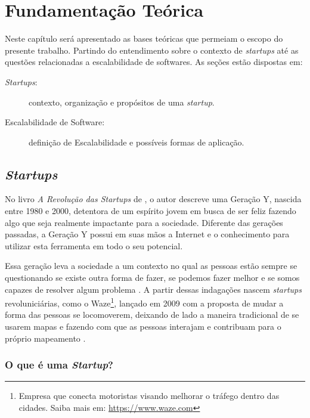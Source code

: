 \chapter[Fundamentação Teórica]{Fundamentação Teórica}

Neste capítulo será apresentado as bases teóricas que permeiam o escopo
do presente trabalho. Partindo do entendimento sobre o contexto de
\textit{startups} até as questões relacionadas a escalabilidade de softwares.
As seções estão dispostas em:

  \begin{description}
    \item[\textit{Startups}:] contexto, organização e propósitos de uma 
      \textit{startup}.
    \item[Escalabilidade de Software:] definição de Escalabilidade e 
      possíveis formas de aplicação.
  \end{description}

\section{\textit{Startups}}

No livro \textit{A Revolução das Startups} de ,
o autor descreve uma Geração Y, nascida entre 1980 e 2000, detentora de um
espírito jovem em busca de ser feliz fazendo algo que seja realmente
impactante para a sociedade. Diferente das gerações passadas, a Geração Y
possui em suas mãos a Internet e o conhecimento para utilizar esta
ferramenta em todo o seu potencial.

Essa geração leva a sociedade a um contexto no qual as pessoas estão sempre
se questionando se existe outra forma de fazer, se podemos fazer melhor e
se somos capazes de resolver algum problema \cite{ARevolucaoDasStartups}.
A partir dessas indagações nascem \textit{startups} revoluniciárias, como
o Waze\footnote{Empresa que conecta motoristas visando melhorar o tráfego
dentro das cidades. Saiba mais em: \url{https://www.waze.com}}, lançado em
2009 com a proposta de mudar a forma das pessoas se locomoverem, deixando 
de lado a maneira tradicional de se usarem mapas e fazendo com que as 
pessoas interajam e contribuam para o próprio mapeamento
\cite{NepomucenoSucessoDoWaze}.

\subsection{O que é uma \textit{Startup}?}

